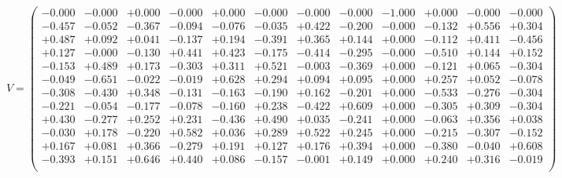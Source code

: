\documentclass[9pt]{article}
\theoremstyle{plain}
\theoremstyle{definition}
\theoremstyle{remark}
\numberwithin{equation}{section}
\begin{document}
$V = \left(
\begin{array}{
cccccccccccc}
-0.000 & -0.000 & +0.000 & -0.000 & +0.000 & -0.000 & -0.000 & -0.000 & -1.000 & +0.000 & -0.000 & -0.000 \\
-0.457 & -0.052 & -0.367 & -0.094 & -0.076 & -0.035 & +0.422 & -0.200 & -0.000 & -0.132 & +0.556 & +0.304 \\
+0.487 & +0.092 & +0.041 & -0.137 & +0.194 & -0.391 & +0.365 & +0.144 & +0.000 & -0.112 & +0.411 & -0.456 \\
+0.127 & -0.000 & -0.130 & +0.441 & +0.423 & -0.175 & -0.414 & -0.295 & -0.000 & -0.510 & +0.144 & +0.152 \\
-0.153 & +0.489 & +0.173 & -0.303 & +0.311 & +0.521 & -0.003 & -0.369 & +0.000 & -0.121 & +0.065 & -0.304 \\
-0.049 & -0.651 & -0.022 & -0.019 & +0.628 & +0.294 & +0.094 & +0.095 & +0.000 & +0.257 & +0.052 & -0.078 \\
-0.308 & -0.430 & +0.348 & -0.131 & -0.163 & -0.190 & +0.162 & -0.201 & +0.000 & -0.533 & -0.276 & -0.304 \\
-0.221 & -0.054 & -0.177 & -0.078 & -0.160 & +0.238 & -0.422 & +0.609 & +0.000 & -0.305 & +0.309 & -0.304 \\
+0.430 & -0.277 & +0.252 & +0.231 & -0.436 & +0.490 & +0.035 & -0.241 & +0.000 & -0.063 & +0.356 & +0.038 \\
-0.030 & +0.178 & -0.220 & +0.582 & +0.036 & +0.289 & +0.522 & +0.245 & +0.000 & -0.215 & -0.307 & -0.152 \\
+0.167 & +0.081 & +0.366 & -0.279 & +0.191 & +0.127 & +0.176 & +0.394 & +0.000 & -0.380 & -0.040 & +0.608 \\
-0.393 & +0.151 & +0.646 & +0.440 & +0.086 & -0.157 & -0.001 & +0.149 & +0.000 & +0.240 & +0.316 & -0.019 \\
\end{array}
\right)$ \newline 
\end{document}
